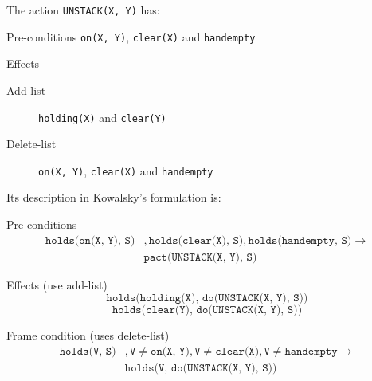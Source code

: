 \begin{example}
    The action \texttt{UNSTACK(X, Y)} has:
    \begin{descriptionlist}
        \item[Pre-conditions] \texttt{on(X, Y)}, \texttt{clear(X)} and \texttt{handempty}
        \item[Effects] \phantom{}
        \begin{description}
            \item[Add-list] \texttt{holding(X)} and \texttt{clear(Y)}
            \item[Delete-list] \texttt{on(X, Y)}, \texttt{clear(X)} and \texttt{handempty}
        \end{description}
    \end{descriptionlist}

    Its description in Kowalsky's formulation is:
    \begin{descriptionlist}
        \item[Pre-conditions] 
            \[ 
                \begin{split}
                    \texttt{holds(on(X, Y), S)}&, \texttt{holds(clear(X), S)}, \texttt{holds(handempty, S)} \rightarrow \\
                    &\texttt{pact(UNSTACK(X, Y), S)} 
                \end{split}
            \]
        
        \item[Effects] (use add-list)
            \[ \texttt{holds(holding(X), do(UNSTACK(X, Y), S))} \]
            \[ \texttt{holds(clear(Y), do(UNSTACK(X, Y), S))} \]
        
        \item[Frame condition] (uses delete-list)
            \[ 
                \begin{split}
                    \texttt{holds(V, S)}&, \texttt{V} \neq \texttt{on(X, Y)}, \texttt{V} \neq \texttt{clear(X)}, \texttt{V} \neq \texttt{handempty}
                    \rightarrow \\
                    & \texttt{holds(V, do(UNSTACK(X, Y), S))}
                \end{split}
            \]
    \end{descriptionlist}
\end{example}


